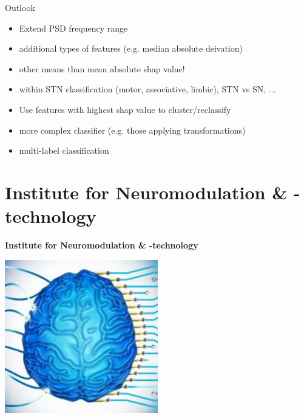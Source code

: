\documentclass[10pt]{beamer}
\begin{document}
\begin{frame}{Outlook}
\begin{itemize}
 \item Extend PSD frequency range
 \item additional types of features (e.g. median absolute deivation)
 \item other means than mean absolute shap value!
 \item within STN classification (motor, associative, limbic), STN vs SN, ...
 \item Use features with highest shap value to cluster/reclassify
 \item more complex classifier (e.g. those applying transformations)
 \item multi-label classification
\end{itemize}
\end{frame}


\section{Institute for Neuromodulation \& -technology}
\begin{frame}
\begin{center}
 \begin{Huge}
  \textbf{Institute for Neuromodulation \& -technology} \\
 \end{Huge}
 \includegraphics[keepaspectratio, height=0.4\textheight, width=0.5\textwidth]{img/logo_nmti.jpg}
 \end{center}
\end{frame}
\end{document}
